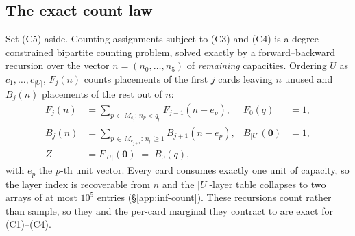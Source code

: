 \subsection{The exact count law}
\label{sec:belief-count}

Set (C5) aside. Counting assignments subject to (C3) and (C4) is a
degree-constrained bipartite counting problem, solved exactly by a
forward--backward recursion over the vector $n = (n_0,\dots,n_5)$ of
\emph{remaining} capacities. Ordering $U$ as $c_1,\dots,c_{|U|}$, $F_j(n)$ counts
placements of the first $j$ cards leaving $n$ unused and $B_j(n)$ placements of
the rest out of $n$:
\begin{align}
  F_j(n) &= \sum_{p \,\in\, M_{c_j} :\, n_p < q_p} F_{j-1}(n + e_p),
  &F_0(q) &= 1, \label{eq:fwd}\\
  B_j(n) &= \sum_{p \,\in\, M_{c_{j+1}} :\, n_p \ge 1} B_{j+1}(n - e_p),
  &B_{|U|}(\mathbf{0}) &= 1, \label{eq:bwd}\\
  Z &= F_{|U|}(\mathbf{0}) \;=\; B_0(q), \label{eq:Z}
\end{align}
with $e_p$ the $p$-th unit vector. Every card consumes exactly one unit of
capacity, so the layer index is recoverable from $n$ and the $|U|$-layer table
collapses to two arrays of at most $10^5$ entries (\S\ref{app:inf-count}). These
recursions count rather than sample, so they and the per-card marginal they
contract to are exact for (C1)--(C4).

